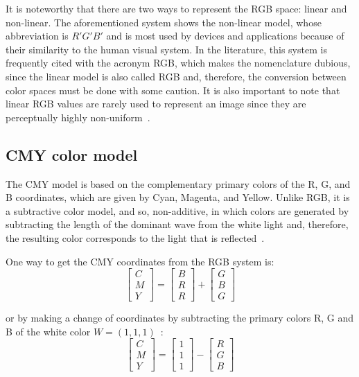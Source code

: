 It is noteworthy that there are two ways to represent the RGB space: linear and non-linear. The aforementioned system shows the non-linear model, whose abbreviation is $R'G'B'$ and is most used by devices and applications because of their similarity to the human visual system. In the literature, this system is frequently cited with the acronym RGB, which makes the nomenclature dubious, since the linear model is also called RGB and, therefore, the conversion between color spaces must be done with some caution. It is also important to note that linear RGB values are rarely used to represent an image since they are perceptually highly non-uniform~\citep{konstantinos:00}.


\subsection{CMY color model}
\label{sec:modelo_cores_cmy}

The CMY model is based on the complementary primary colors of the R, G, and B coordinates, which are given by Cyan, Magenta, and Yellow. Unlike RGB, it is a subtractive color model, and so, non-additive, in which colors are generated by subtracting the length of the dominant wave from the white light and, therefore, the resulting color corresponds to the light that is reflected~\citep{gonzalez:02}.

One way to get the CMY coordinates from the RGB system is:\\
\begin{equation}
  \begin{bmatrix}
    C \\ M \\ Y
  \end{bmatrix} = 
  \begin{bmatrix}
    B \\ R \\ R
  \end{bmatrix} +
  \begin{bmatrix}
    G \\ B \\ G
  \end{bmatrix}
\end{equation}

\noindent or by making a change of coordinates by subtracting the primary colors R, G and B of the white color $W = (1, 1, 1)$~\citep{gonzalez:02}:
\begin{equation}
  \begin{bmatrix}
    C \\ M \\ Y
  \end{bmatrix} = 
  \begin{bmatrix}
    1 \\ 1 \\ 1
  \end{bmatrix} -
  \begin{bmatrix}
    R \\ G \\ B
  \end{bmatrix}
\end{equation}

